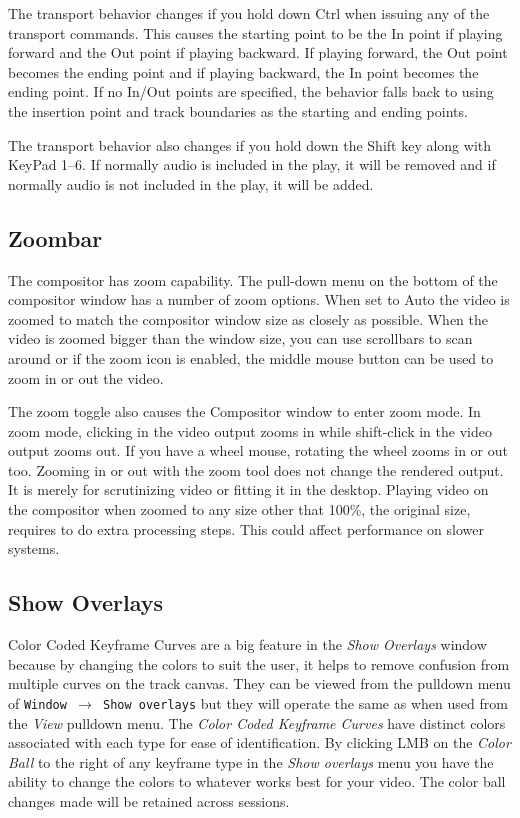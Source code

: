 The transport behavior changes if you hold down Ctrl when issuing any of the transport commands. This causes the starting point to be the In point if playing forward and the Out point if playing backward. If playing forward, the Out point becomes the ending point and if playing backward, the In point becomes the ending point. If no In/Out points are specified, the behavior falls back to using the insertion point and track boundaries as the starting and ending points.

The transport behavior also changes if you hold down the Shift key along with KeyPad 1--6.  
If normally audio is included in the play, it will be removed and if normally audio is not included in the play, it will be added.


\subsection{Zoombar}%
\label{sub:zoombar}

The compositor has zoom capability. 
The pull-down menu on the bottom of the compositor window has a number of zoom options. 
When set to Auto the video is zoomed to match the compositor window size as closely as possible. 
When the video is zoomed bigger than the window size,  you can use scrollbars to scan around or if the zoom icon is enabled, the middle mouse button can be used to zoom in or out the video.

The zoom toggle also causes the Compositor window to enter zoom mode. 
In zoom mode, clicking in the video output zooms in while shift-click in the video output zooms out. 
If you have a wheel mouse, rotating the wheel zooms in or out too. 
Zooming in or out with the zoom tool does not change the rendered output. 
It is merely for scrutinizing video or fitting it in the desktop. Playing video on the compositor when zoomed to any size other that 100\%, the original size, requires \CGG{} to do extra processing steps. 
This could affect performance on slower systems.

\subsection{Show Overlays}%
\label{sub:show_overlays}

Color Coded Keyframe Curves are a big feature in the \textit{Show Overlays} window because by changing the colors to suit the user, it helps to remove confusion from multiple curves on the track canvas.  
They can be viewed from the pulldown menu of \texttt{Window $\rightarrow$ Show overlays} but they will operate the same as when used from the \textit{View} pulldown menu.  
The \textit{Color Coded Keyframe Curves} have distinct colors associated with each type for ease of identification.  
By clicking LMB on the \textit{Color Ball} to the right of any keyframe type in the \textit{Show overlays} menu you have the ability to change the colors to whatever works best for your video.  
The color ball changes made will be retained across sessions.

